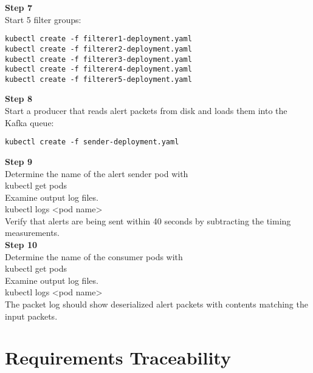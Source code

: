 \textbf{Step 7}\\
Start 5 filter groups:\\

\begin{verbatim}
kubectl create -f filterer1-deployment.yaml
kubectl create -f filterer2-deployment.yaml
kubectl create -f filterer3-deployment.yaml
kubectl create -f filterer4-deployment.yaml
kubectl create -f filterer5-deployment.yaml
\end{verbatim}

\textbf{Step 8}\\
Start a producer that reads alert packets from disk and loads them into
the Kafka queue:\\[2\baselineskip]

\begin{verbatim}
kubectl create -f sender-deployment.yaml
\end{verbatim}

\textbf{Step 9}\\
Determine the name of the alert sender pod with\\[2\baselineskip]kubectl
get pods\\[2\baselineskip]Examine output log
files.\\[2\baselineskip]kubectl logs \textless{}pod
name\textgreater{}\\[2\baselineskip]Verify that alerts are being sent
within 40 seconds by subtracting the timing
measurements.\\[2\baselineskip]\textbf{Step 10}\\
Determine the name of the consumer pods with\\[2\baselineskip]kubectl
get pods\\[2\baselineskip]Examine output log
files.\\[2\baselineskip]kubectl logs \textless{}pod
name\textgreater{}\\[2\baselineskip]The packet log should show
deserialized alert packets with contents matching the input
packets.\\[2\baselineskip]

\newpage
\appendix
\section{Requirements Traceability}\label{requirements-traceability}

